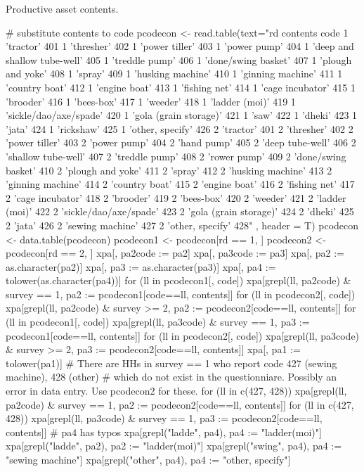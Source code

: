 Productive asset contents. \gobblepars
\begin{Schunk}
\begin{Sinput}
# substitute contents to code
pcodecon <- read.table(text="rd contents code
1 'tractor' 401
1 'thresher' 402
1 'power tiller' 403
1 'power pump' 404
1 'deep and shallow tube-well' 405
1 'treddle pump' 406
1 'done/swing basket' 407
1 'plough and yoke' 408
1 'spray' 409
1 'husking machine' 410
1 'ginning machine' 411
1 'country boat' 412
1 'engine boat' 413
1 'fishing net' 414
1 'cage incubator' 415
1 'brooder' 416
1 'bees-box' 417
1 'weeder' 418
1 'ladder (moi)' 419
1 'sickle/dao/axe/spade' 420
1 'gola (grain storage)' 421
1 'saw' 422
1 'dheki' 423
1 'jata' 424
1 'rickshaw' 425
1 'other, specify' 426
2 'tractor' 401
2 'thresher' 402
2 'power tiller' 403
2 'power pump' 404
2 'hand pump' 405
2 'deep tube-well' 406
2 'shallow tube-well' 407
2 'treddle pump' 408
2 'rower pump' 409
2 'done/swing basket' 410
2 'plough and yoke' 411
2 'spray' 412
2 'husking machine' 413
2 'ginning machine' 414
2 'country boat' 415
2 'engine boat' 416
2 'fishing net' 417
2 'cage incubator' 418
2 'brooder' 419
2 'bees-box' 420
2 'weeder' 421
2 'ladder (moi)' 422
2 'sickle/dao/axe/spade' 423
2 'gola (grain storage)' 424
2 'dheki' 425
2 'jata' 426
2 'sewing machine' 427
2 'other, specify' 428"
, header = T)
pcodecon <- data.table(pcodecon)
pcodecon1 <- pcodecon[rd == 1, ]
pcodecon2 <- pcodecon[rd == 2, ]
xpa[, pa2code := pa2]
xpa[, pa3code := pa3]
xpa[, pa2 := as.character(pa2)]
xpa[, pa3 := as.character(pa3)]
xpa[, pa4 := tolower(as.character(pa4))]
for (ll in pcodecon1[, code])
  xpa[grepl(ll, pa2code) & survey == 1, pa2 := pcodecon1[code==ll, contents]]
for (ll in pcodecon2[, code])
  xpa[grepl(ll, pa2code) & survey >= 2, pa2 := pcodecon2[code==ll, contents]]
for (ll in pcodecon1[, code])
  xpa[grepl(ll, pa3code) & survey == 1, pa3 := pcodecon1[code==ll, contents]]
for (ll in pcodecon2[, code])
  xpa[grepl(ll, pa3code) & survey >= 2, pa3 := pcodecon2[code==ll, contents]]
xpa[, pa1 := tolower(pa1)]
# There are HHs in survey == 1 who report code 427 (sewing machine), 428 (other) 
# which do not exist in the questionniare. Possibly an error in data entry. Use pcodecon2 for these.
for (ll in c(427, 428))
  xpa[grepl(ll, pa2code) & survey == 1, pa2 := pcodecon2[code==ll, contents]]
for (ll in c(427, 428))
  xpa[grepl(ll, pa3code) & survey == 1, pa3 := pcodecon2[code==ll, contents]]
# pa4 has typos
xpa[grepl("ladde", pa4), pa4 := "ladder(moi)"]
xpa[grepl("ladde", pa2), pa2 := "ladder(moi)"]
xpa[grepl("swing", pa4), pa4 := "sewing machine"]
xpa[grepl("other", pa4), pa4 := "other, specify"]
\end{Sinput}
\end{Schunk}

